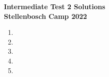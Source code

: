 \documentclass{article}
\begin{document}
\thispagestyle{empty}

\begin{center}
  \textbf{Intermediate Test 2 Solutions}
  \\ \vspace{1em}
  \textbf{\large Stellenbosch Camp 2022}
\end{center}


\begin{enumerate}[itemsep=24pt]

\item %

\item


\item 


\item 


\item


\end{enumerate}
\end{document}

